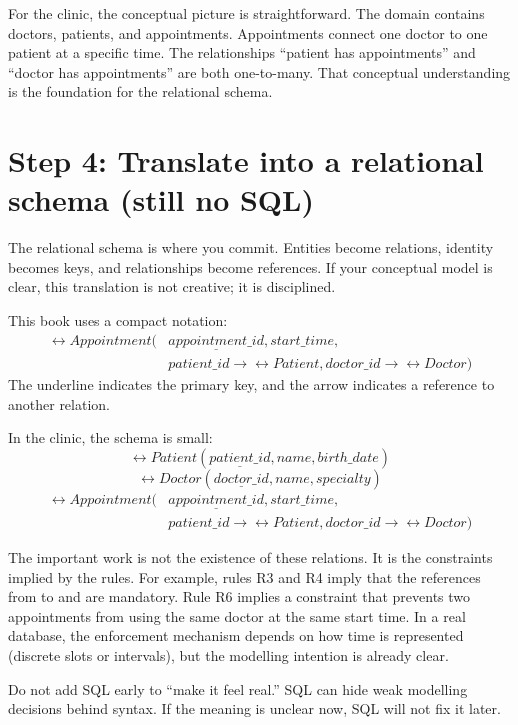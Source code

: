 For the clinic, the conceptual picture is straightforward.
The domain contains doctors, patients, and appointments.
Appointments connect one doctor to one patient at a specific time.
The relationships “patient has appointments” and “doctor has appointments” are both one-to-many.
That conceptual understanding is the foundation for the relational schema.

\section{Step 4: Translate into a relational schema (still no SQL)}
The relational schema is where you commit.
Entities become relations, identity becomes keys, and relationships become references.
If your conceptual model is clear, this translation is not creative; it is disciplined.

This book uses a compact notation:
\[
\begin{aligned}
\rel{Appointment}(&\underline{appointment\_id}, start\_time, \\
&patient\_id \rightarrow \rel{Patient}, doctor\_id \rightarrow \rel{Doctor})
\end{aligned}
\]
The underline indicates the primary key, and the arrow indicates a reference to another relation.

In the clinic, the schema is small:
\[
\rel{Patient}(\underline{patient\_id}, name, birth\_date)
\]
\[
\rel{Doctor}(\underline{doctor\_id}, name, specialty)
\]
\[
\begin{aligned}
\rel{Appointment}(&\underline{appointment\_id}, start\_time, \\
&patient\_id \rightarrow \rel{Patient}, doctor\_id \rightarrow \rel{Doctor})
\end{aligned}
\]

The important work is not the existence of these relations.
It is the constraints implied by the rules.
For example, rules R3 and R4 imply that the references from  to  and  are mandatory.
Rule R6 implies a constraint that prevents two appointments from using the same doctor at the same start time.
In a real database, the enforcement mechanism depends on how time is represented (discrete slots or intervals), but the modelling intention is already clear.

\begin{notebox}
Do not add SQL early to “make it feel real.”
SQL can hide weak modelling decisions behind syntax.
If the meaning is unclear now, SQL will not fix it later.
\end{notebox}

